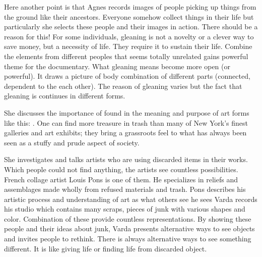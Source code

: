 Here another point is that Agnes records images of people picking up things from the ground like their ancestors. Everyone somehow collect things in their life but particularly she selects these people and their images in action. There should be a reason for this! For some individuals, gleaning is not a novelty or a clever way to save money, but a necessity of life. They require it to sustain their life. Combine the elements from different peoples that seems totally unrelated gains powerful theme for the documentary. What gleaning means become more open (or powerful). It draws a picture of body combination of different parts (connected, dependent to the each other). The reason of gleaning varies but the fact that gleaning is continues in different forms.

She discusses the importance of found in the meaning and purpose of art forms like this:  \cite{cruickshank2007work}. One can find more treasure in trash than many of New York’s finest galleries and art exhibits; they bring a grassroots feel to what has always been seen as a stuffy and prude aspect of society.

She investigates and talks artists who are using discarded items in their works. Which people could not find anything, the artists see countless possibilities. French collage artist Louis Pons is one of them. He specializes in reliefs and assemblages made wholly from refused materials and trash. Pons describes his artistic process and understanding of art as what others see  he sees  Varda records his studio which contains many scraps, pieces of junk with various shapes and color. Combination of these provide countless representations. By showing these people and their ideas about junk, Varda presents alternative ways to see objects and invites people to rethink. There is always alternative ways to see something different. It is like giving life or finding life from discarded object.
